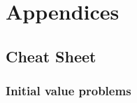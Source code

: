 \documentclass[letterpaper,10pt,english]{jupyterBook}
\begin{document}
\sphinxstepscope


\part{Appendices}

\sphinxstepscope


\chapter{Cheat Sheet}
\label{\detokenize{8_Appendices/8.0_Cheat_sheet:cheat-sheet}}\label{\detokenize{8_Appendices/8.0_Cheat_sheet::doc}}

\section{Initial value problems}
\end{document}
